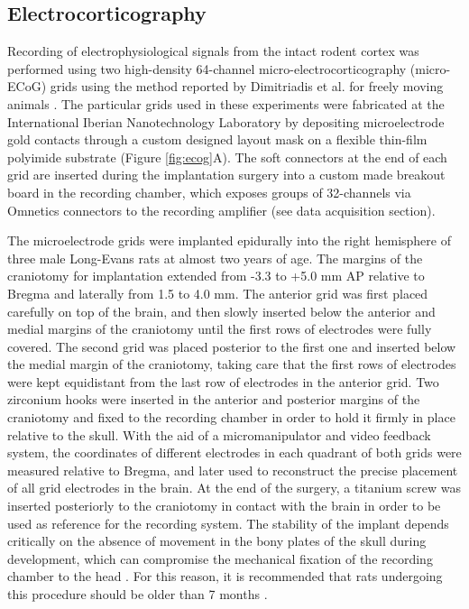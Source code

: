 \subsection{Electrocorticography}

Recording of electrophysiological signals from the intact rodent cortex was performed using two high-density 64-channel micro-electrocorticography (micro-ECoG) grids using the method reported by Dimitriadis et al. for freely moving animals \citep{Dimitriadis2014}. The particular grids used in these experiments were fabricated at the International Iberian Nanotechnology Laboratory by depositing microelectrode gold contacts through a custom designed layout mask on a flexible thin-film polyimide substrate (Figure \ref{fig:ecog}A). The soft connectors at the end of each grid are inserted during the implantation surgery into a custom made breakout board in the recording chamber, which exposes groups of 32-channels via Omnetics connectors to the recording amplifier (see data acquisition section).

The microelectrode grids were implanted epidurally into the right hemisphere of three male Long-Evans rats at almost two years of age. The margins of the craniotomy for implantation extended from -3.3 to +5.0 \si{\milli\meter} AP relative to Bregma and laterally from 1.5 to 4.0 \si{\milli\meter}. The anterior grid was first placed carefully on top of the brain, and then slowly inserted below the anterior and medial margins of the craniotomy until the first rows of electrodes were fully covered. The second grid was placed posterior to the first one and inserted below the medial margin of the craniotomy, taking care that the first rows of electrodes were kept equidistant from the last row of electrodes in the anterior grid. Two zirconium hooks were inserted in the anterior and posterior margins of the craniotomy and fixed to the recording chamber in order to hold it firmly in place relative to the skull. With the aid of a micromanipulator and video feedback system, the coordinates of different electrodes in each quadrant of both grids were measured relative to Bregma, and later used to reconstruct the precise placement of all grid electrodes in the brain. At the end of the surgery, a titanium screw was inserted posteriorly to the craniotomy in contact with the brain in order to be used as reference for the recording system. The stability of the implant depends critically on the absence of movement in the bony plates of the skull during development, which can compromise the mechanical fixation of the recording chamber to the head \citep{Dimitriadis2014}. For this reason, it is recommended that rats undergoing this procedure should be older than 7 months \citep{Dimitriadis2014}.

